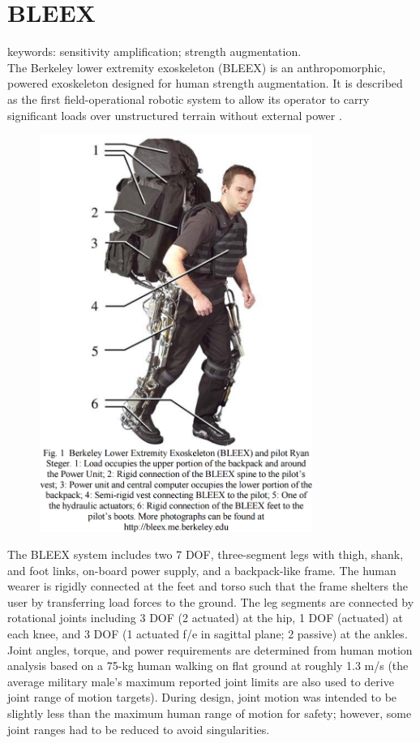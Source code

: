 \section{BLEEX}
\label{exo:bleex}
\begin{refsection}

keywords: sensitivity amplification; strength augmentation.\\

The Berkeley lower extremity exoskeleton (BLEEX) is an anthropomorphic, powered exoskeleton designed for human strength augmentation.  It is described as the first field-operational robotic system to allow its operator to carry significant loads over unstructured terrain without external power \cite{bleex_design_2006}.

\begin{figure}[ht]
  \centering
  \includegraphics[width=3.5in]{exos/figs/bleex_exo.png}
\end{figure}

The BLEEX system includes two 7 DOF, three-segment legs with thigh, shank, and foot links, on-board power supply, and a backpack-like frame.  The human wearer is rigidly connected at the feet and torso such that the frame shelters the user by transferring load forces to the ground.  The leg segments are connected by rotational joints including 3 DOF (2 actuated) at the hip, 1 DOF (actuated) at each knee, and 3 DOF (1 actuated f/e in sagittal 
plane; 2 passive) at the ankles.  Joint angles, torque, and power requirements are determined from human motion analysis based on a 75-kg human walking on flat ground at roughly 1.3 m/s (the average military male's maximum reported joint limits are also used to derive joint range of motion targets).  During design, joint motion was intended to be slightly less than the maximum human range of motion for safety; however, some joint ranges had to be reduced to avoid singularities.


\end{refsection}

